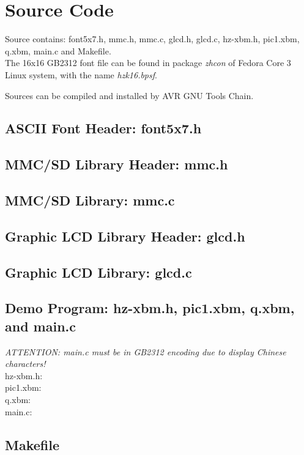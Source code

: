 \documentclass[11pt,a4paper]{article}
\begin{document}
\section{Source Code}
Source contains: font5x7.h, mmc.h, mmc.c, glcd.h, glcd.c, hz-xbm.h, pic1.xbm, q.xbm, main.c 
and Makefile.\\
The 16x16 GB2312 font file can be found in package \textit{zhcon} of Fedora Core 3 Linux system,
with the name \textit{hzk16.bpsf}. 

Sources can be compiled and installed by AVR GNU Tools Chain.

\subsection{ASCII Font Header: font5x7.h}


\subsection{MMC/SD Library Header: mmc.h}


\subsection{MMC/SD Library: mmc.c}


\subsection{Graphic LCD Library Header: glcd.h}


\subsection{Graphic LCD Library: glcd.c}


\subsection{Demo Program: hz-xbm.h, pic1.xbm, q.xbm, and main.c}
\emph{ATTENTION: main.c must be in GB2312 encoding due to display Chinese characters!}\\
hz-xbm.h:\\


pic1.xbm:\\


q.xbm:\\


main.c:\\


\subsection{Makefile}

\end{document}
